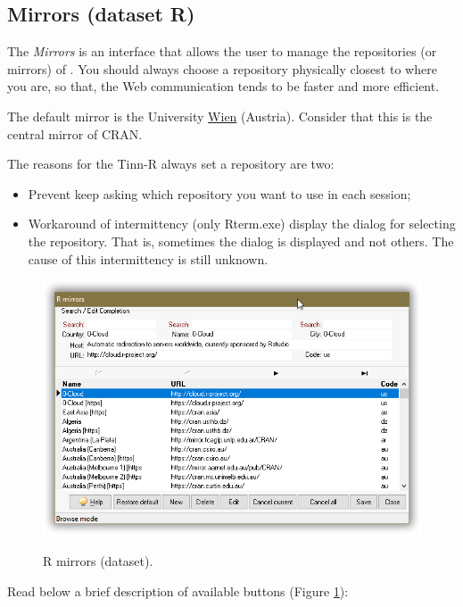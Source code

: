 \subsection{Mirrors (dataset R)}

The \textit{Mirrors} is an interface that allows the user to manage the repositories (or mirrors) of \RR{}.
You should always choose a repository physically closest to where you are,
so that, the Web communication tends to be faster and more efficient.

The default mirror is the University \href{http://cran.at.r-project.org/}{Wien}
(Austria). Consider that this is the central mirror of CRAN.

The reasons for the Tinn-R always set a repository are two:
\begin {itemize}
   \item Prevent \RR{} keep asking which repository you want to use in each session;
   \item Workaround of intermittency (only Rterm.exe) display the dialog for selecting the repository.
    That is, sometimes the dialog is displayed and not others. The cause of this intermittency is still unknown.
\end {itemize}

\begin{figure}[H]
  \includegraphics[scale=0.8]{./res/dlg_mirrors.png}\\
  \caption{R mirrors (dataset).}
  \label{fig:dlg_mirrors}
\end{figure}

Read below a brief description of available buttons (Figure \ref{fig:dlg_mirrors}):

